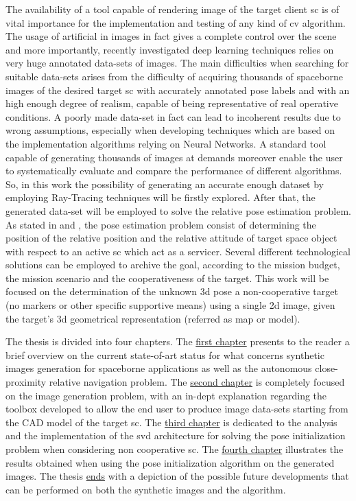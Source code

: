 The availability of a tool capable of rendering image of the target client \acrshort{sc} is of vital importance for the implementation and testing of any kind of \acrshort{cv} algorithm.
The usage of artificial in images in fact gives a complete control over the scene and more importantly, recently investigated deep learning techniques relies on very huge annotated data-sets of images. The main difficulties when searching for suitable data-sets arises from the difficulty of acquiring thousands of spaceborne images of the desired target \acrshort{sc} with accurately annotated pose labels and with an high enough degree of realism, capable of being representative of real operative conditions. A poorly made data-set in fact can lead to incoherent results due to wrong assumptions, especially when developing techniques which are based on the implementation algorithms relying on Neural Networks. A standard tool capable of generating thousands of images at demands moreover enable the user to systematically evaluate and compare the performance of different algorithms.
So, in this work the possibility of generating an accurate enough dataset by employing Ray-Tracing techniques will be firstly explored. After that, the generated data-set will be employed to solve the relative pose estimation problem. As stated in \cite{D2014} and \cite{Sharma2018}, the pose estimation problem consist of determining the position of the relative position and the relative attitude of target space object with respect to an active \acrshort{sc} which act as a servicer. Several different technological solutions can be employed to archive the goal, according to the mission budget, the mission scenario and the cooperativeness of the target. This work will be focused on the determination of the unknown \acrshort{3d} pose a non-cooperative target (no markers or other specific supportive means) using a single \acrfull{2d} image, given the target's \acrfull{3d} geometrical representation (referred as map or model).

The thesis is divided into four chapters. The \hyperref[chap:first-chapter]{first chapter} presents to the reader a brief overview on the current state-of-art status for what concerns synthetic images generation for spaceborne applications as well as the autonomous close-proximity relative navigation problem. The \hyperref[chap:second-chapter]{second chapter} is completely focused on the image generation problem, with an in-dept explanation regarding the toolbox developed to allow the end user to produce image data-sets starting from the CAD model of the target \acrshort{sc}. The \hyperref[chap:third-chapter]{third chapter} is dedicated to the analysis and the implementation of the \acrshort{svd} architecture for solving the pose initialization problem when considering non cooperative \acrshort{sc}. The \hyperref[chap:fourth-chapter]{fourth chapter} illustrates the results obtained when using the pose initialization algorithm on the generated images. The thesis \hyperref[chap:conclusions]{ends} with a depiction of the possible future developments that can be performed on both the synthetic images and the algorithm.